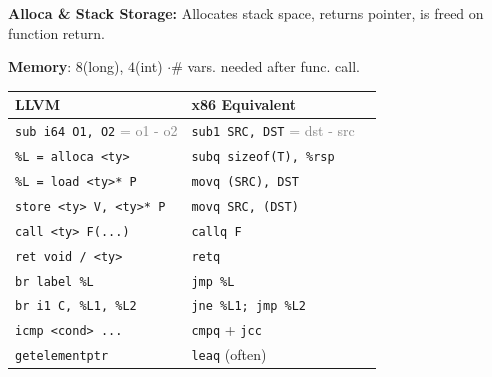 \textbf{Alloca \& Stack Storage:}  Allocates stack space, returns pointer, is freed on function return.

\textbf{Memory}: $8$(long), $4$(int) $\cdot \# $ vars. needed after func. call.
\begin{tabular}{@{}l l l@{}}
\toprule
\textbf{LLVM} & \textbf{x86 Equivalent} \\
\midrule
\texttt{sub i64 O1, O2} \textcolor{gray}{= o1 - o2} & \texttt{sub1 SRC, DST} \textcolor{gray}{= dst - src} \\
\texttt{\%L = alloca <ty>}  & \texttt{subq sizeof(T), \%rsp} \\
\texttt{\%L = load <ty>* P} & \texttt{movq (SRC), DST} \\
\texttt{store <ty> V, <ty>* P}  & \texttt{movq SRC, (DST)} \\
\midrule
\texttt{call <ty> F(...)} & \texttt{callq F} \\
\texttt{ret void / <ty>}  & \texttt{retq} \\
\texttt{br label \%L} & \texttt{jmp \%L} \\
\texttt{br i1 C, \%L1, \%L2} & \texttt{jne \%L1; jmp \%L2} \\
\midrule
\texttt{icmp <cond> ...} & \texttt{cmpq} + \texttt{jcc} \\
\texttt{getelementptr} & \texttt{leaq} (often) \\
\bottomrule
\end{tabular}







